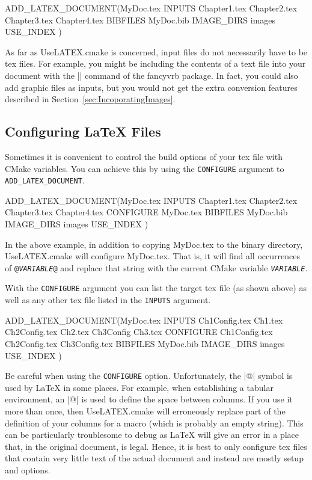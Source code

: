 \documentclass{article}
\newcommand*{\textfile}[1]{\textsf{#1}}
\newcommand*{\textlatexpackage}[1]{\textsf{#1}}
\newcommand*{\textcmake}[1]{\texttt{#1}}
\newcommand*{\textcmakevar}[1]{\textcmake{#1}}
\newcommand*{\textvar}[1]{\textit{#1}}
\newcommand*{\UseLATEX}{\textfile{UseLATEX.cmake}\xspace}
\newcommand*{\latex}{\LaTeX\xspace}
\newcommand*{\ald}{\textcmake{ADD\_LATEX\_DOCUMENT}\xspace}
\begin{document}
  \begin{CodeListing}
ADD_LATEX_DOCUMENT(MyDoc.tex
  INPUTS Chapter1.tex Chapter2.tex Chapter3.tex Chapter4.tex
  BIBFILES MyDoc.bib
  IMAGE_DIRS images
  USE_INDEX
  )
  \end{CodeListing}

  As far as \UseLATEX is concerned, input files do not necessarily have to
  be tex files.  For example, you might be including the contents of a text
  file into your document with the \textlatex|\VerbatimInput| command of
  the \textlatexpackage{fancyvrb} package.  In fact, you could also add
  graphic files as inputs, but you would not get the extra conversion
  features described in Section~\ref{sec:IncoporatingImages}.

  \subsection{Configuring \latex Files}
  \label{sec:ConfiguringLatexFiles}

  Sometimes it is convenient to control the build options of your tex file
  with CMake variables. You can achieve this by using the
  \textcmake{CONFIGURE} argument to \ald.

  \begin{CodeListing}
ADD_LATEX_DOCUMENT(MyDoc.tex
  INPUTS Chapter1.tex Chapter2.tex Chapter3.tex Chapter4.tex
  CONFIGURE MyDoc.tex
  BIBFILES MyDoc.bib
  IMAGE_DIRS images
  USE_INDEX
  )
  \end{CodeListing}

  In the above example, in addition to copying \textfile{MyDoc.tex} to the
  binary directory, \UseLATEX will configure \textfile{MyDoc.tex}. That is,
  it will find all occurrences of \textcmake{@\textvar{VARIABLE}@} and
  replace that string with the current CMake variable
  \textcmakevar{\textvar{VARIABLE}}.

  With the \textcmake{CONFIGURE} argument you can list the target tex file
  (as shown above) as well as any other tex file listed in the
  \textcmake{INPUTS} argument.

  \begin{CodeListing}
ADD_LATEX_DOCUMENT(MyDoc.tex
  INPUTS Ch1Config.tex Ch1.tex Ch2Config.tex
         Ch2.tex Ch3Config Ch3.tex
  CONFIGURE Ch1Config.tex Ch2Config.tex Ch3Config.tex
  BIBFILES MyDoc.bib
  IMAGE_DIRS images
  USE_INDEX
  )
  \end{CodeListing}

  Be careful when using the \textcmake{CONFIGURE} option. Unfortunately,
  the \textlatex|@| symbol is used by \latex in some places. For example,
  when establishing a tabular environment, an \textlatex|@| is used to
  define the space between columns. If you use it more than once, then
  \UseLATEX will erroneously replace part of the definition of your columns
  for a macro (which is probably an empty string). This can be particularly
  troublesome to debug as \latex will give an error in a place that, in the
  original document, is legal. Hence, it is best to only configure tex
  files that contain very little text of the actual document and instead
  are mostly setup and options.
\end{document}
